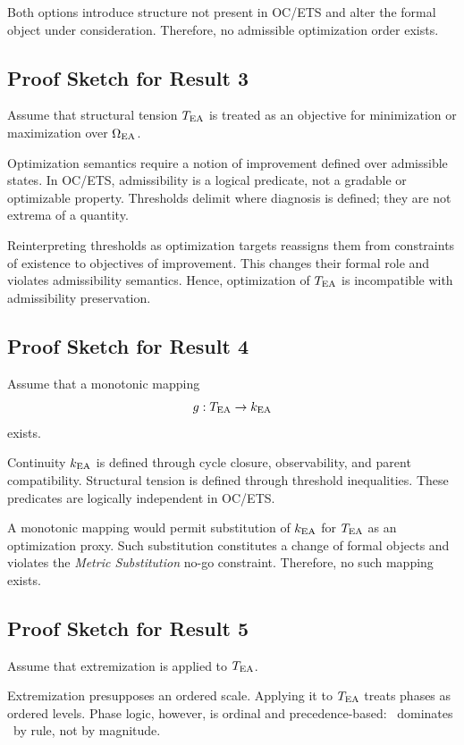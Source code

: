 Both options introduce structure not present in OC/ETS and alter the
formal object under consideration. Therefore, no admissible optimization
order exists.

\subsection{Proof Sketch for Result 3}

Assume that structural tension $T_{\mathrm{EA}}$ is treated as an objective for
minimization or maximization over $\Omega_{\mathrm{EA}}$.

Optimization semantics require a notion of improvement defined over
admissible states. In OC/ETS, admissibility is a logical predicate, not a
gradable or optimizable property. Thresholds delimit where diagnosis is
defined; they are not extrema of a quantity.

Reinterpreting thresholds as optimization targets reassigns them from
constraints of existence to objectives of improvement. This changes their
formal role and violates admissibility semantics. Hence, optimization of
$T_{\mathrm{EA}}$ is incompatible with admissibility preservation.

\subsection{Proof Sketch for Result 4}

Assume that a monotonic mapping
\[
g : T_{\mathrm{EA}} \rightarrow k_{\mathrm{EA}}
\]
exists.

Continuity $k_{\mathrm{EA}}$ is defined through cycle closure, observability, and
parent compatibility. Structural tension is defined through threshold
inequalities. These predicates are logically independent in OC/ETS.

A monotonic mapping would permit substitution of $k_{\mathrm{EA}}$ for $T_{\mathrm{EA}}$ as an
optimization proxy. Such substitution constitutes a change of formal
objects and violates the \emph{Metric Substitution} no-go constraint.
Therefore, no such mapping exists.

\subsection{Proof Sketch for Result 5}

Assume that extremization is applied to $T_{\mathrm{EA}}$.

Extremization presupposes an ordered scale. Applying it to $T_{\mathrm{EA}}$ treats
phases as ordered levels. Phase logic, however, is ordinal and
precedence-based: \PHASESTOP\ dominates \PHASECOLLAPSE\ by rule, not by
magnitude.

